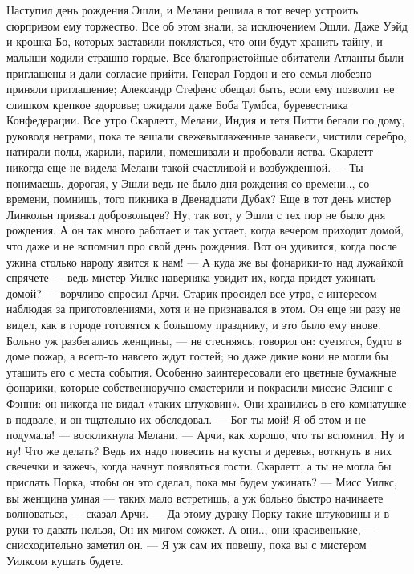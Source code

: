 \chapter{\ }

Наступил день рождения Эшли, и Мелани решила в тот вечер устроить сюрпризом ему торжество. Все об этом знали, за исключением Эшли. Даже Уэйд и крошка Бо, которых заставили поклясться, что они будут хранить тайну, и малыши ходили страшно гордые. Все благопристойные обитатели Атланты были приглашены и дали согласие прийти. Генерал Гордон и его семья любезно приняли приглашение; Александр Стефенс обещал быть, если ему позволит не слишком крепкое здоровье; ожидали даже Боба Тумбса, буревестника Конфедерации.
Все утро Скарлетт, Мелани, Индия и тетя Питти бегали по дому, руководя неграми, пока те вешали свежевыглаженные занавеси, чистили серебро, натирали полы, жарили, парили, помешивали и пробовали яства. Скарлетт никогда еще не видела Мелани такой счастливой и возбужденной.
— Ты понимаешь, дорогая, у Эшли ведь не было дня рождения со времени.., со времени, помнишь, того пикника в Двенадцати Дубах? Еще в тот день мистер Линкольн призвал добровольцев? Ну, так вот, у Эшли с тех пор не было дня рождения. А он так много работает и так устает, когда вечером приходит домой, что даже и не вспомнил про свой день рождения. Вот он удивится, когда после ужина столько народу явится к нам!
— А куда же вы фонарики-то над лужайкой спрячете — ведь мистер Уилкс наверняка увидит их, когда придет ужинать домой? — ворчливо спросил Арчи.
Старик просидел все утро, с интересом наблюдая за приготовлениями, хотя и не признавался в этом. Он еще ни разу не видел, как в городе готовятся к большому празднику, и это было ему внове. Больно уж разбегались женщины, — не стесняясь, говорил он: суетятся, будто в доме пожар, а всего-то навсего ждут гостей; но даже дикие кони не могли бы утащить его с места события. Особенно заинтересовали его цветные бумажные фонарики, которые собственноручно смастерили и покрасили миссис Элсинг с Фэнни: он никогда не видал «таких штуковин». Они хранились в его комнатушке в подвале, и он тщательно их обследовал.
— Бог ты мой! Я об этом и не подумала! — воскликнула Мелани. — Арчи, как хорошо, что ты вспомнил. Ну и ну! Что же делать? Ведь их надо повесить на кусты и деревья, воткнуть в них свечечки и зажечь, когда начнут появляться гости. Скарлетт, а ты не могла бы прислать Порка, чтобы он это сделал, пока мы будем ужинать?
— Мисс Уилкс, вы женщина умная — таких мало встретишь, а уж больно быстро начинаете волноваться, — сказал Арчи. — Да этому дураку Порку такие штуковины и в руки-то давать нельзя, Он их мигом сожжет. А они.., они красивенькие, — снисходительно заметил он. — Я уж сам их повешу, пока вы с мистером Уилксом кушать будете.
